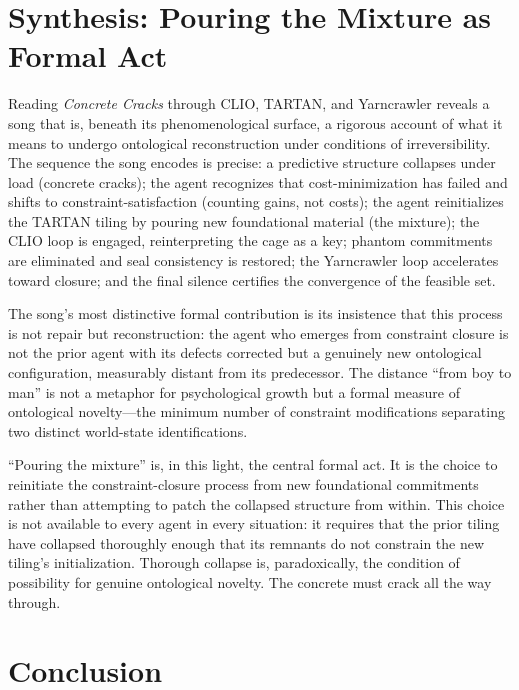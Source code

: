 \documentclass[12pt, a4paper]{article}
\begin{document}
\section{Synthesis: Pouring the Mixture as Formal Act}

Reading \textit{Concrete Cracks} through CLIO, TARTAN, and Yarncrawler reveals a song that is, beneath its phenomenological surface, a rigorous account of what it means to undergo ontological reconstruction under conditions of irreversibility. The sequence the song encodes is precise: a predictive structure collapses under load (concrete cracks); the agent recognizes that cost-minimization has failed and shifts to constraint-satisfaction (counting gains, not costs); the agent reinitializes the TARTAN tiling by pouring new foundational material (the mixture); the CLIO loop is engaged, reinterpreting the cage as a key; phantom commitments are eliminated and seal consistency is restored; the Yarncrawler loop accelerates toward closure; and the final silence certifies the convergence of the feasible set.

The song's most distinctive formal contribution is its insistence that this process is not repair but reconstruction: the agent who emerges from constraint closure is not the prior agent with its defects corrected but a genuinely new ontological configuration, measurably distant from its predecessor. The distance ``from boy to man'' is not a metaphor for psychological growth but a formal measure of ontological novelty---the minimum number of constraint modifications separating two distinct world-state identifications.

``Pouring the mixture'' is, in this light, the central formal act. It is the choice to reinitiate the constraint-closure process from new foundational commitments rather than attempting to patch the collapsed structure from within. This choice is not available to every agent in every situation: it requires that the prior tiling have collapsed thoroughly enough that its remnants do not constrain the new tiling's initialization. Thorough collapse is, paradoxically, the condition of possibility for genuine ontological novelty. The concrete must crack all the way through.

\section{Conclusion}
\end{document}
